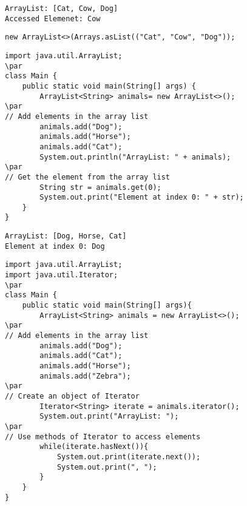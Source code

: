 \documentclass{book}
\def\lthtmlcheckvsize{\ifdim\ht\sizebox<\vsize 
  \ifdim\wd\sizebox<\hsize\expandafter\hfill\fi \expandafter\vfill
  \else\expandafter\vss\fi}%
\begin{document}
{\newpage\clearpage
{}%
\begin{lstlisting}
ArrayList: [Cat, Cow, Dog]
Accessed Elemenet: Cow
\end{lstlisting}%
\lthtmlfigureZ
\lthtmlcheckvsize\clearpage}

{\newpage\clearpage
{}%
\begin{lstlisting}
new ArrayList<>(Arrays.asList(("Cat", "Cow", "Dog"));
\end{lstlisting}%
\lthtmlfigureZ
\lthtmlcheckvsize\clearpage}

{\newpage\clearpage
{}%
\begin{lstlisting}
import java.util.ArrayList;
\par
class Main {
    public static void main(String[] args) {
        ArrayList<String> animals= new ArrayList<>();
\par
// Add elements in the array list
        animals.add("Dog");
        animals.add("Horse");
        animals.add("Cat");
        System.out.println("ArrayList: " + animals);
\par
// Get the element from the array list
        String str = animals.get(0);
        System.out.print("Element at index 0: " + str);
    }
}
\end{lstlisting}%
\lthtmlfigureZ
\lthtmlcheckvsize\clearpage}

{\newpage\clearpage
{}%
\begin{lstlisting}
ArrayList: [Dog, Horse, Cat]
Element at index 0: Dog
\end{lstlisting}%
\lthtmlfigureZ
\lthtmlcheckvsize\clearpage}

{\newpage\clearpage
{}%
\begin{lstlisting}
import java.util.ArrayList;
import java.util.Iterator;
\par
class Main {
    public static void main(String[] args){
        ArrayList<String> animals = new ArrayList<>();
\par
// Add elements in the array list
        animals.add("Dog");
        animals.add("Cat");
        animals.add("Horse");
        animals.add("Zebra");
\par
// Create an object of Iterator
        Iterator<String> iterate = animals.iterator();
        System.out.print("ArrayList: ");
\par
// Use methods of Iterator to access elements
        while(iterate.hasNext()){
            System.out.print(iterate.next());
            System.out.print(", ");
        }
    }
}
\end{lstlisting}%
\lthtmlfigureZ
\lthtmlcheckvsize\clearpage}
\end{document}
